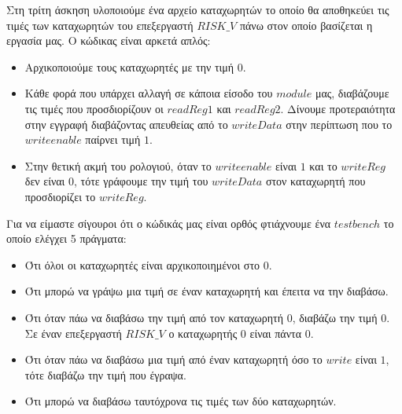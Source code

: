 Στη τρίτη άσκηση υλοποιούμε ένα αρχείο καταχωρητών το οποίο θα αποθηκεύει τις 
τιμές των καταχωρητών του επεξεργαστή $RISK\_V$ πάνω στον οποίο βασίζεται η
εργασία μας. Ο κώδικας είναι αρκετά απλός:
\begin{itemize}
    \item Αρχικοποιούμε τους καταχωρητές με την τιμή 0.
    \item Κάθε φορά που υπάρχει αλλαγή σε κάποια είσοδο του $module$ μας,
    διαβάζουμε τις τιμές που προσδιορίζουν οι $readReg1$ και $readReg2$. 
    Δίνουμε προτεραιότητα στην εγγραφή διαβάζοντας απευθείας από το
    $writeData$ στην περίπτωση που το $write enable$ παίρνει τιμή $1$.
    \item Στην θετική ακμή του ρολογιού, όταν το $write enable$ είναι $1$
    και το $writeReg$ δεν είναι $0$, τότε γράφουμε την τιμή του $writeData$
    στον καταχωρητή που προσδιορίζει το $writeReg$.
\end{itemize}
Για να είμαστε σίγουροι ότι ο κώδικάς μας είναι ορθός φτιάχνουμε ένα $testbench$
το οποίο ελέγχει 5 πράγματα:
\begin{itemize}
    \item Ότι όλοι οι καταχωρητές είναι αρχικοποιημένοι στο 0.
    \item Ότι μπορώ να γράψω μια τιμή σε έναν καταχωρητή και έπειτα να την διαβάσω.
    \item Ότι όταν πάω να διαβάσω την τιμή από τον καταχωρητή 0, διαβάζω την τιμή 0.
    Σε έναν επεξεργαστή $RISK\_V$ ο καταχωρητής 0 είναι πάντα 0.
    \item Ότι όταν πάω να διαβάσω μια τιμή από έναν καταχωρητή όσο το $write$ είναι $1$,
    τότε διαβάζω την τιμή που έγραψα.
    \item Ότι μπορώ να διαβάσω ταυτόχρονα τις τιμές των δύο καταχωρητών.
\end{itemize}
